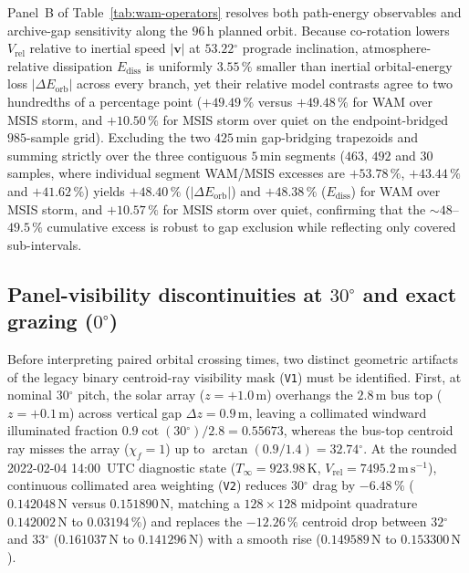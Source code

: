 \documentclass[12pt]{article}
\newcommand{\unit}[1]{\,\mathrm{#1}}
\newcommand{\degree}{\ensuremath{{}^\circ}}
\begin{document}
Panel~B of Table~\ref{tab:wam-operators} resolves both path-energy observables and archive-gap sensitivity along the $96\unit{h}$ planned orbit. Because co-rotation lowers $V_{\mathrm{rel}}$ relative to inertial speed $|\mathbf{v}|$ at $53.22\degree$ prograde inclination, atmosphere-relative dissipation $E_{\mathrm{diss}}$ is uniformly $3.55\,\%$ smaller than inertial orbital-energy loss $|\Delta E_{\mathrm{orb}}|$ across every branch, yet their relative model contrasts agree to two hundredths of a percentage point ($+49.49\,\%$ versus $+49.48\,\%$ for WAM over MSIS storm, and $+10.50\,\%$ for MSIS storm over quiet on the endpoint-bridged $985$-sample grid). Excluding the two $425\unit{min}$ gap-bridging trapezoids and summing strictly over the three contiguous $5\unit{min}$ segments ($463$, $492$ and $30$ samples, where individual segment WAM/MSIS excesses are $+53.78\,\%$, $+43.44\,\%$ and $+41.62\,\%$) yields $+48.40\,\%$ ($|\Delta E_{\mathrm{orb}}|$) and $+48.38\,\%$ ($E_{\mathrm{diss}}$) for WAM over MSIS storm, and $+10.57\,\%$ for MSIS storm over quiet, confirming that the $\sim48$--$49.5\,\%$ cumulative excess is robust to gap exclusion while reflecting only covered sub-intervals.

\subsection{Panel-visibility discontinuities at $30\degree$ and exact grazing ($0\degree$)}
\label{sec:shadow}

Before interpreting paired orbital crossing times, two distinct geometric artifacts of the legacy binary centroid-ray visibility mask (\texttt{V1}) must be identified. First, at nominal $30\degree$ pitch, the solar array ($z = +1.0\unit{m}$) overhangs the $2.8\unit{m}$ bus top ($z = +0.1\unit{m}$) across vertical gap $\Delta z = 0.9\unit{m}$, leaving a collimated windward illuminated fraction $0.9\cot(30\degree)/2.8 = 0.55673$, whereas the bus-top centroid ray misses the array ($\chi_f = 1$) up to $\arctan(0.9/1.4) = 32.74\degree$. At the rounded 2022-02-04 14:00~UTC diagnostic state ($T_\infty = 923.98\unit{K}$, $V_{\mathrm{rel}} = 7495.2\unit{m\,s^{-1}}$), continuous collimated area weighting (\texttt{V2}) reduces $30\degree$ drag by $-6.48\,\%$ ($0.142048\unit{N}$ versus $0.151890\unit{N}$, matching a $128\times128$ midpoint quadrature $0.142002\unit{N}$ to $0.03194\,\%$) and replaces the $-12.26\,\%$ centroid drop between $32\degree$ and $33\degree$ ($0.161037\unit{N}$ to $0.141296\unit{N}$) with a smooth rise ($0.149589\unit{N}$ to $0.153300\unit{N}$).
\end{document}
